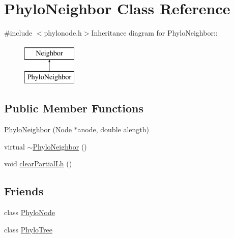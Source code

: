 \hypertarget{classPhyloNeighbor}{
\section{PhyloNeighbor Class Reference}
\label{classPhyloNeighbor}
}


{\ttfamily \#include $<$phylonode.h$>$}Inheritance diagram for PhyloNeighbor::\begin{figure}[H]
\begin{center}
\leavevmode
\includegraphics[height=2cm]{classPhyloNeighbor}
\end{center}
\end{figure}
\subsection*{Public Member Functions}
\begin{DoxyCompactItemize}
\item 
\hyperlink{classPhyloNeighbor_a7bed9a973f5f185142219be91e1ca654}{PhyloNeighbor} (\hyperlink{classNode}{Node} $\ast$anode, double alength)
\item 
virtual \hyperlink{classPhyloNeighbor_a60a5db92883b1af1679adab253bf1ce1}{$\sim$PhyloNeighbor} ()
\item 
void \hyperlink{classPhyloNeighbor_a361b1d766721309ab38f6c4ea028adf5}{clearPartialLh} ()
\end{DoxyCompactItemize}
\subsection*{Friends}
\begin{DoxyCompactItemize}
\item 
\hypertarget{classPhyloNeighbor_abd4cfdd3e9b09cc356912ddff682f6c3}{
class \hyperlink{classPhyloNeighbor_abd4cfdd3e9b09cc356912ddff682f6c3}{PhyloNode}}
\label{classPhyloNeighbor_abd4cfdd3e9b09cc356912ddff682f6c3}

\item 
\hypertarget{classPhyloNeighbor_a38fa7a30e653e52f48d662f26bd549be}{
class \hyperlink{classPhyloNeighbor_a38fa7a30e653e52f48d662f26bd549be}{PhyloTree}}
\label{classPhyloNeighbor_a38fa7a30e653e52f48d662f26bd549be}

\end{DoxyCompactItemize}


